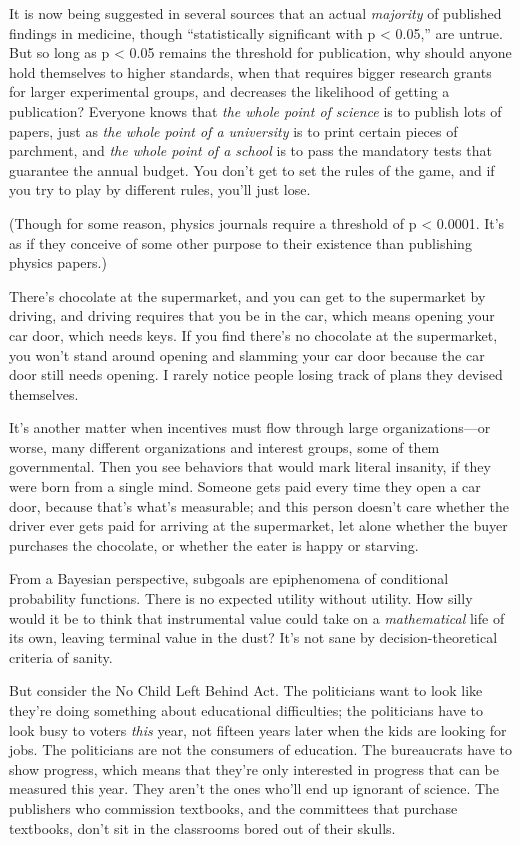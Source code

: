 {
 It is now being suggested in several sources that an actual
\textit{majority} of published findings in medicine, though
``statistically significant with p {\textless}
0.05,'' are untrue. But so long as p {\textless} 0.05
remains the threshold for publication, why should anyone hold
themselves to higher standards, when that requires bigger research
grants for larger experimental groups, and decreases the likelihood of
getting a publication? Everyone knows that \textit{the whole point of
science} is to publish lots of papers, just as \textit{the whole point
of a university} is to print certain pieces of parchment, and
\textit{the whole point of a school} is to pass the mandatory tests
that guarantee the annual budget. You don't get to set
the rules of the game, and if you try to play by different rules,
you'll just lose.}

{
 (Though for some reason, physics journals require a threshold of p
{\textless} 0.0001. It's as if they conceive of some
other purpose to their existence than publishing physics papers.)}

{
 There's chocolate at the supermarket, and you can
get to the supermarket by driving, and driving requires that you be in
the car, which means opening your car door, which needs keys. If you
find there's no chocolate at the supermarket, you
won't stand around opening and slamming your car door
because the car door still needs opening. I rarely notice people losing
track of plans they devised themselves.}

{
 It's another matter when incentives must flow
through large organizations---or worse, many different organizations
and interest groups, some of them governmental. Then you see behaviors
that would mark literal insanity, if they were born from a single mind.
Someone gets paid every time they open a car door, because
that's what's measurable; and this
person doesn't care whether the driver ever gets paid
for arriving at the supermarket, let alone whether the buyer purchases
the chocolate, or whether the eater is happy or starving.}

{
 From a Bayesian perspective, subgoals are epiphenomena of
conditional probability functions. There is no expected utility without
utility. How silly would it be to think that instrumental value could
take on a \textit{mathematical} life of its own, leaving terminal value
in the dust? It's not sane by decision-theoretical
criteria of sanity.}

{
 But consider the No Child Left Behind Act. The politicians want to
look like they're doing something about educational
difficulties; the politicians have to look busy to voters \textit{this}
year, not fifteen years later when the kids are looking for jobs. The
politicians are not the consumers of education. The bureaucrats have to
show progress, which means that they're only interested
in progress that can be measured this year. They aren't
the ones who'll end up ignorant of science. The
publishers who commission textbooks, and the committees that purchase
textbooks, don't sit in the classrooms bored out of
their skulls.}

